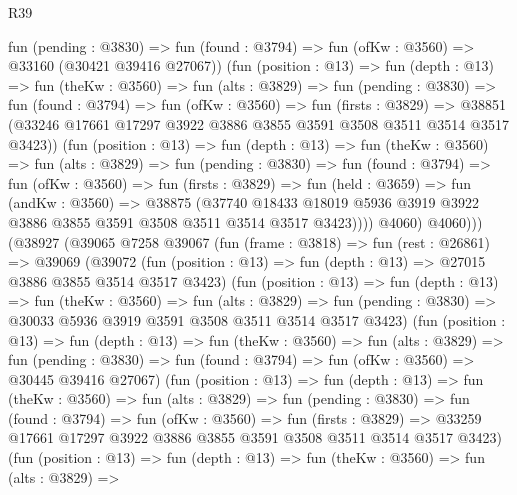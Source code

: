 \begin{lexlean}{R39}
\begin{coremodule}
                fun (pending : @3830) =>
                fun (found : @3794) => fun (ofKw : @3560) => @33160 (@30421 @39416 @27067))
                (fun (position : @13) =>
                fun (depth : @13) =>
                fun (theKw : @3560) =>
                fun (alts : @3829) =>
                fun (pending : @3830) =>
                fun (found : @3794) =>
                fun (ofKw : @3560) =>
                fun (firsts : @3829) =>
                @38851 (@33246 @17661 @17297 @3922 @3886 @3855 @3591 @3508 @3511 @3514 @3517 @3423))
                (fun (position : @13) =>
                fun (depth : @13) =>
                fun (theKw : @3560) =>
                fun (alts : @3829) =>
                fun (pending : @3830) =>
                fun (found : @3794) =>
                fun (ofKw : @3560) =>
                fun (firsts : @3829) =>
                fun (held : @3659) =>
                fun (andKw : @3560) =>
                @38875
                  (@37740
                    @18433
                    @18019
                    @5936
                    @3919
                    @3922
                    @3886
                    @3855
                    @3591
                    @3508
                    @3511
                    @3514
                    @3517
                    @3423))))
            @4060)
          @4060)))
    (@38927
      (@39065
        @7258
        @39067
        (fun (frame : @3818) =>
        fun (rest : @26861) =>
        @39069
          (@39072
            (fun (position : @13) => fun (depth : @13) => @27015 @3886 @3855 @3514 @3517 @3423)
            (fun (position : @13) =>
            fun (depth : @13) =>
            fun (theKw : @3560) =>
            fun (alts : @3829) =>
            fun (pending : @3830) => @30033 @5936 @3919 @3591 @3508 @3511 @3514 @3517 @3423)
            (fun (position : @13) =>
            fun (depth : @13) =>
            fun (theKw : @3560) =>
            fun (alts : @3829) =>
            fun (pending : @3830) =>
            fun (found : @3794) => fun (ofKw : @3560) => @30445 @39416 @27067)
            (fun (position : @13) =>
            fun (depth : @13) =>
            fun (theKw : @3560) =>
            fun (alts : @3829) =>
            fun (pending : @3830) =>
            fun (found : @3794) =>
            fun (ofKw : @3560) =>
            fun (firsts : @3829) =>
            @33259 @17661 @17297 @3922 @3886 @3855 @3591 @3508 @3511 @3514 @3517 @3423)
            (fun (position : @13) =>
            fun (depth : @13) =>
            fun (theKw : @3560) =>
            fun (alts : @3829) =>

\end{coremodule}
\end{lexlean}
